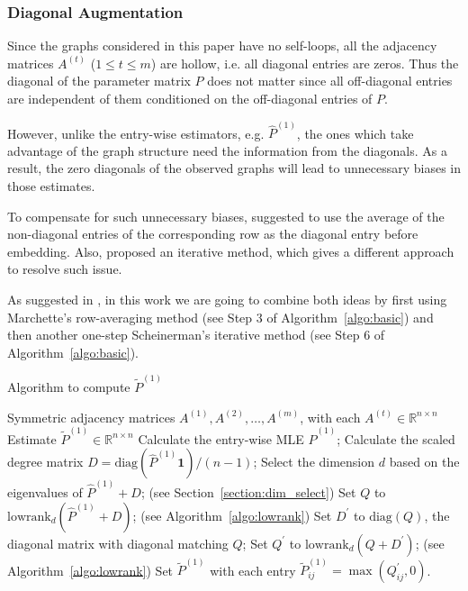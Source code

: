 \documentclass[a4paper]{article}
\renewcommand{\hat}{\widehat}
\begin{document}
\subsubsection{Diagonal Augmentation}
\label{section:diag_aug}

Since the graphs considered in this paper have no self-loops, all the adjacency matrices $A^{(t)}$ ($1 \le t \le m$) are hollow, i.e. all diagonal entries are zeros. Thus the diagonal of the parameter matrix $P$ does not matter since all off-diagonal entries are independent of them conditioned on the off-diagonal entries of $P$.

However, unlike the entry-wise estimators, e.g. $\hat{P}^{(1)}$, the ones which take advantage of the graph structure need the information from the diagonals. As a result, the zero diagonals of the observed graphs will lead to unnecessary biases in those estimates.

To compensate for such unnecessary biases, \citet{marchette2011vertex} suggested to use the average of the non-diagonal entries of the corresponding row as the diagonal entry before embedding. Also, \citet{scheinerman2010modeling} proposed an iterative method, which gives a different approach to resolve such issue.

As suggested in \citep{tang2016law}, in this work we are going to combine both ideas by first using Marchette's row-averaging method (see Step 3 of Algorithm~\ref{algo:basic}) and then another one-step Scheinerman's iterative method (see Step 6 of Algorithm~\ref{algo:basic}).


\begin{algorithm}[H]
\caption{Algorithm to compute $\widetilde{P}^{(1)}$}
\label{algo:basic}
\begin{algorithmic}[1]
\REQUIRE Symmetric adjacency matrices $A^{(1)}, A^{(2)}, \dotsc, A^{(m)}$, with each $A^{(t)} \in \mathbb{R}^{n \times n}$
\ENSURE Estimate $\widetilde{P}^{(1)} \in \mathbb{R}^{n \times n}$
\STATE Calculate the entry-wise MLE $\hat{P}^{(1)}$;
\STATE Calculate the scaled degree matrix $D = \mathrm{diag}(\hat{P}^{(1)} \bm{1})/(n-1)$;
\STATE Select the dimension $d$ based on the eigenvalues of $\hat{P}^{(1)} + D$; (see Section~\ref{section:dim_select})
\STATE Set $Q$ to $\mathrm{lowrank}_d(\hat{P}^{(1)} + D)$; (see Algorithm~\ref{algo:lowrank})
\STATE Set $D^{\prime}$ to $ \mathrm{diag}(Q)$, the diagonal matrix with diagonal matching $Q$; 
\STATE Set $Q^{\prime}$ to $\mathrm{lowrank}_d(Q + D^{\prime})$; (see Algorithm~\ref{algo:lowrank})
\STATE Set $\widetilde{P}^{(1)}$ with each entry $\widetilde{P}^{(1)}_{ij} = \max(Q^{\prime}_{ij}, 0)$.
\end{algorithmic}
\end{algorithm}
\end{document}
